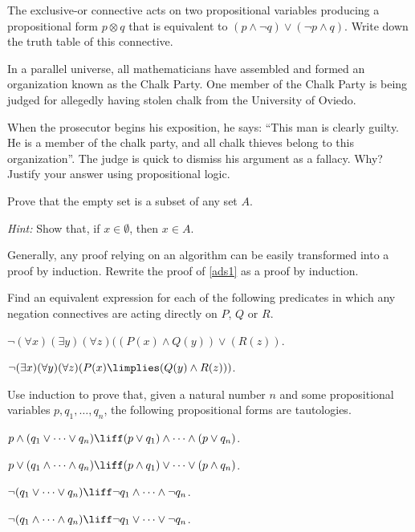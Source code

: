 

\begin{exercises}
\item The exclusive-or connective acts on two propositional variables producing a propositional form $p\otimes q$ that is equivalent to $(p\land \lnot q) \lor (\lnot p \land q)$. Write down the truth table of this connective.

\item In a parallel universe, all mathematicians have assembled and formed an organization known as the Chalk Party. One member of the Chalk Party is being judged for allegedly having stolen chalk from the University of Oviedo.

When the prosecutor begins his exposition, he says: ``This man is clearly guilty. He is a member of the chalk party, and all chalk thieves belong to this organization''. The judge is quick to dismiss his argument as a fallacy. Why? Justify your answer using propositional logic. 

\item Prove that the empty set is a subset of any set $A$.

\emph{Hint:} Show that, if $x\in \emptyset$, then $x\in A$.

\item Generally, any proof relying on an algorithm can be easily transformed into a proof by induction. Rewrite the proof of \ref{ads1} as a proof by induction.

\item Find an equivalent expression for each of the following predicates in which any negation connectives are acting directly on $P$, $Q$ or $R$.
\begin{lettered}
\item $\lnot (\forall x)(\exists y)(\forall z)( (P(x) \land Q(y))\lor (R(z))$.
\item $\lnot (\exists x)(\forall y) (\forall z) ( P(x) \limplies (Q(y) \land R(z)))$.
\end{lettered}

\item Use induction to prove that, given a natural number $n$ and some propositional variables $p, q_1,\ldots,q_n$, the following propositional forms are tautologies.
\begin{lettered}
\item $p \land (q_1 \lor \cdots \lor q_n) \liff (p\lor q_1) \land \cdots \land (p \lor q_n)$.
\item $p \lor (q_1 \land \cdots \land q_n) \liff (p\land q_1) \lor \cdots \lor (p \land q_n)$.
\item $\lnot(q_1\lor \cdots \lor q_n) \liff \lnot q_1 \land \cdots \land \lnot q_n$. 
\item $\lnot(q_1\land \cdots \land q_n) \liff \lnot q_1 \lor \cdots \lor \lnot q_n$. 
\end{lettered}



\end{exercises}
